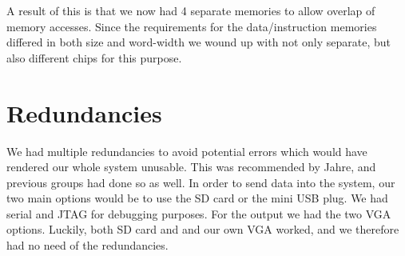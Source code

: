 A result of this is that we now had 4 separate memories to allow overlap of
memory accesses. Since the requirements for the data/instruction memories differed in both size and word-width 
we wound up with not only separate, but also different chips for this purpose.



\section{Redundancies}
We had multiple redundancies to avoid potential
errors which would have rendered our whole system unusable. This was recommended
by Jahre, and previous groups had done so as well. In order to send data into
the system, our two main options would be to use the \ac{SD} card or the mini
\ac{USB} plug. We had serial and \ac{JTAG} for debugging purposes. For the
output we had the two \ac{VGA} options. Luckily, both \ac{SD} card and and our
own \ac{VGA} worked, and we therefore had no need of the
redundancies.
